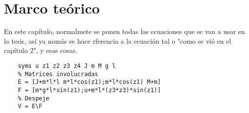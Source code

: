 

\chapter{Marco teórico}
En este capítulo, normalmete se ponen todas las ecuaciones que se van a usar en la tesis, así ya nomás se hace rferencia a la ecuación tal o "como se vió en el capítulo 2", y esas cosas.
\begin{lstlisting}[frame=single]
    % Declaracion de las variables simbolicas
    syms u z1 z2 z3 z4 J m M g l 
    % Matrices involucradas
    E = [J+m*l*l m*l*cos(z1);m*l*cos(z1) M+m] 
    F = [m*g*l*sin(z1);u+m*l*(z3*z3)*sin(z1)] 
    % Despeje
    V = E\F
\end{lstlisting}

\blindtext